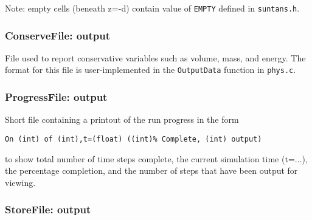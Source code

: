 \bigskip
\noindent
Note: empty cells (beneath z=-d) contain value of \verb+EMPTY+ defined in \verb+suntans.h+.

\subsubsection{ConserveFile: output}

File used to report conservative variables such as volume, mass, and energy.  The format for this file
is user-implemented in the \verb+OutputData+ function in \verb+phys.c+.

\subsubsection{ProgressFile: output}

Short file containing a printout of the run progress in the form
\begin{verbatim}
On (int) of (int),t=(float) ((int)% Complete, (int) output)
\end{verbatim}
to show total number of time steps complete, the current simulation time (t=...), 
the percentage completion, and the number of steps that have been output for
viewing.

\subsubsection{StoreFile: output}

